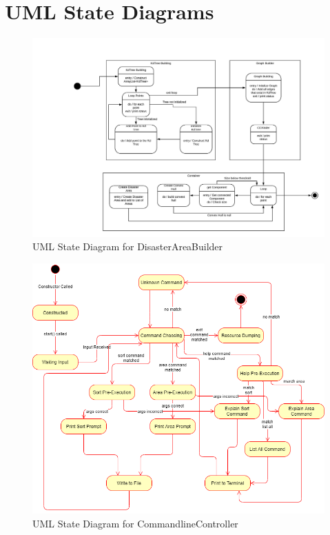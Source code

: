 \documentclass[12pt]{article}
\begin{document}
\section{UML State Diagrams}
\newpage
\begin{figure}
            \includegraphics[scale=0.7]{State_Machine_DisasterAreaBuilder.jpeg}
            \caption{UML State Diagram for DisasterAreaBuilder}
            \label{fig:state_one}
\end{figure}

\begin{figure}
            \includegraphics[scale=0.7]{State_Diagram_CLC.png}
            \caption{UML State Diagram for CommandlineController}
            \label{fig:state_two}
\end{figure}

\normalsize
\end{document}
